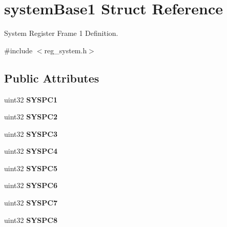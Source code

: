 \hypertarget{structsystemBase1}{}\section{system\+Base1 Struct Reference}
\label{structsystemBase1}


System Register Frame 1 Definition.  




{\ttfamily \#include $<$reg\+\_\+system.\+h$>$}

\subsection*{Public Attributes}
\begin{DoxyCompactItemize}
\item 
\mbox{\label{structsystemBase1_a30d34a8276e3c01ff332f02aa886730d}} 
uint32 {\bfseries S\+Y\+S\+P\+C1}
\item 
\mbox{\label{structsystemBase1_a8302f21c340f8cd9f60ce8a2cd06264e}} 
uint32 {\bfseries S\+Y\+S\+P\+C2}
\item 
\mbox{\label{structsystemBase1_a57b5f65432442f2c355e1db5b4d79b40}} 
uint32 {\bfseries S\+Y\+S\+P\+C3}
\item 
\mbox{\label{structsystemBase1_af0663d3f448bea5674b998db4f523631}} 
uint32 {\bfseries S\+Y\+S\+P\+C4}
\item 
\mbox{\label{structsystemBase1_a8cfdfaacfdd7e1aed91378cd8ea2d79b}} 
uint32 {\bfseries S\+Y\+S\+P\+C5}
\item 
\mbox{\label{structsystemBase1_a233d6507d0d06c950168f7ef75ef8c65}} 
uint32 {\bfseries S\+Y\+S\+P\+C6}
\item 
\mbox{\label{structsystemBase1_a27613de742655cbea834a91e258a66c8}} 
uint32 {\bfseries S\+Y\+S\+P\+C7}
\item 
\mbox{\label{structsystemBase1_a54c7c55243fb35d81eda3ed4bef767f4}} 
uint32 {\bfseries S\+Y\+S\+P\+C8}
\item 
\mbox{\label{structsystemBase1_a3e8d1222acd96f6b536a784faa9171fc}} 

\end{DoxyCompactItemize}
